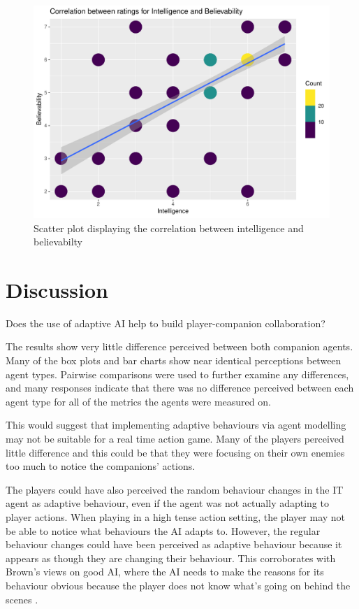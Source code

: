 \documentclass{IEEEtran}
\begin{document}
\begin{figure}
  \centering
  \includegraphics[width=\linewidth]{Images/Graphs/PH2IntelBelieveScatter.pdf}
  
\caption{Scatter plot displaying the correlation between intelligence and believabilty}
\label{fig:PH2IntelBelieveScatter}
\end{figure}

\section{Discussion}
\label{Discussion}

Does the use of adaptive AI help to build player-companion collaboration?

The results show very little difference perceived between both companion agents. Many of the box plots and bar charts show near identical perceptions between agent types. Pairwise comparisons were used to further examine any differences, and many responses indicate that there was no difference perceived between each agent type for all of the metrics the agents were measured on.

This would suggest that implementing adaptive behaviours via agent modelling may not be suitable for a real time action game. Many of the players perceived little difference and this could be that they were focusing on their own enemies too much to notice the companions’ actions.

The players could have also perceived the random behaviour changes in the IT agent as adaptive behaviour, even if the agent was not actually adapting to player actions. When playing in a high tense action setting, the player may not be able to notice what behaviours the AI adapts to. However, the regular behaviour changes could have been perceived as adaptive behaviour because it appears as though they are changing their behaviour. This corroborates with Brown’s views on good AI, where the AI needs to make the reasons for its behaviour obvious because the player does not know what’s going on behind the scenes \cite{GMTGoodAI}.
\end{document}
